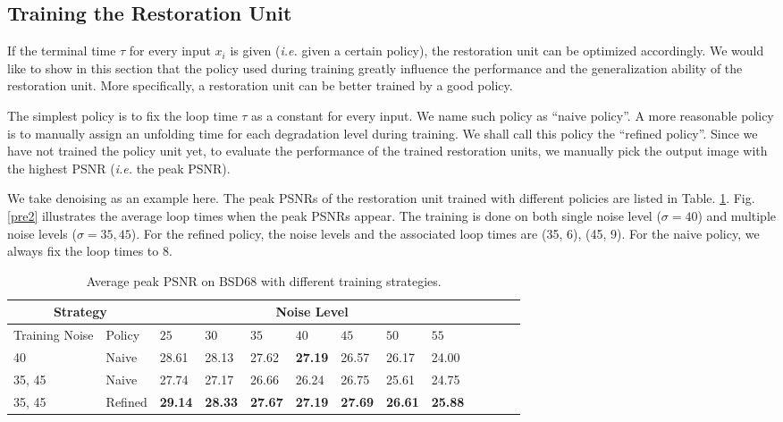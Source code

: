 \documentclass{article} %
\begin{document}
\subsection{Training the Restoration Unit}

If the terminal time $\tau$ for every input $x_i$ is given (\textit{i.e.} given
a certain policy), the restoration unit can be optimized accordingly.
We would like to show in this section that the policy used during training
greatly influence the performance and the generalization ability of
the restoration unit. More specifically, a restoration unit can be better trained
by a good policy.

The simplest policy is to fix the loop time $\tau$ as a constant for
every input. We name such policy as ``naive policy''. A more reasonable policy is
to manually assign an unfolding time for each degradation level
during training. We shall call this policy the ``refined policy''. Since we
have not trained the policy unit yet, to evaluate the performance of the trained
restoration units, we manually pick the output image with the highest PSNR
(\textit{i.e.} the peak PSNR).

We take denoising as an example here. The peak PSNRs of
the restoration unit trained with different policies are listed
in Table. \ref{pre1}. Fig. \ref{pre2} illustrates the average loop times
when the peak PSNRs appear. The training is done on both
single noise level ($\sigma=40$) and multiple noise levels ($\sigma=35,45$).
For the refined policy, the noise levels and the associated loop times are
(35, 6), (45, 9). For the naive policy, we always fix the loop times to 8.

\begin{table}[ht]
	\caption{Average peak PSNR on BSD68 with different training strategies.}
	\label{pre1}
	\centering
	\begin{tabular}{ll|lllllllllll}
		\midrule
		\multicolumn{2}{c|}{Strategy}&\multicolumn{7}{c}{Noise Level}\\
		\midrule
		Training Noise&Policy &$25$&$30$&$35$&$40$&$45$&$50$&$55$\\
		\midrule
		40      &Naive   & 28.61         & 28.13        & 27.62        &\textbf{27.19} & 26.57        & 26.17        & 24.00\\
		35, 45  &Naive   & 27.74         & 27.17        & 26.66        & 26.24         & 26.75        & 25.61        & 24.75 \\
		35, 45  &Refined & \textbf{29.14}&\textbf{28.33}&\textbf{27.67}&\textbf{27.19} &\textbf{27.69}&\textbf{26.61}&\textbf{25.88} \\
		\bottomrule
	\end{tabular}
\end{table}
\end{document}
